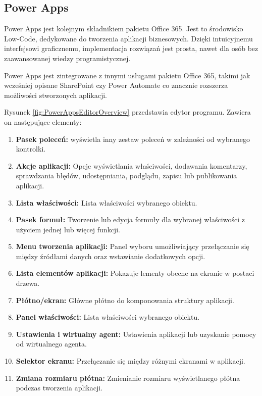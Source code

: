 \subsection{Power Apps}

Power Apps jest kolejnym składnikiem pakietu Office 365. Jest to środowisko Low-Code, dedykowane do tworzenia aplikacji biznesowych. Dzięki intuicyjnemu interfejsowi graficznemu, implementacja rozwiązań jest prosta, nawet dla osób bez zaawansowanej wiedzy programistycznej.

Power Apps jest zintegrowane z innymi usługami pakietu Office 365, takimi jak wcześniej opisane SharePoint czy Power Automate co znacznie rozszerza możliwości stworzonych aplikacji.

Rysunek \ref{fig:PowerAppsEditorOverview} przedstawia edytor programu. Zawiera on następujące elementy:
\begin{enumerate}
    \item \textbf{Pasek poleceń:} wyświetla inny zestaw poleceń w zależności od wybranego kontrolki.
    \item \textbf{Akcje aplikacji:} Opcje wyświetlania właściwości, dodawania komentarzy, sprawdzania błędów, udostępniania, podglądu, zapisu lub publikowania aplikacji.
    \item \textbf{Lista właściwości:} Lista właściwości wybranego obiektu.
    \item \textbf{Pasek formuł:} Tworzenie lub edycja formuły dla wybranej właściwości z użyciem jednej lub więcej funkcji.
    \item \textbf{Menu tworzenia aplikacji:} Panel wyboru umożliwiający przełączanie się między źródłami danych oraz wstawianie dodatkowych opcji.
    \item \textbf{Lista elementów aplikacji:} Pokazuje lementy obecne na ekranie w postaci drzewa.
    \item \textbf{Płótno/ekran:} Główne płótno do komponowania struktury aplikacji.
    \item \textbf{Panel właściwości:} Lista właściwości wybranego obiektu.
    \item \textbf{Ustawienia i wirtualny agent:} Ustawienia aplikacji lub uzyskanie pomocy od wirtualnego agenta.
    \item \textbf{Selektor ekranu:} Przełączanie się między różnymi ekranami w aplikacji.
    \item \textbf{Zmiana rozmiaru płótna:} Zmienianie rozmiaru wyświetlanego płótna podczas tworzenia aplikacji.
\end{enumerate}


